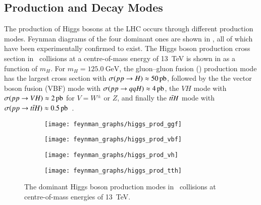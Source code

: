 \subsection{Production and Decay Modes}

The production of Higgs bosons at the LHC occurs through different production
modes. Feynman diagrams of the four dominant ones are shown in
, all of which have been experimentally confirmed to
exist. The Higgs boson production cross section in \pp~collisions at a
centre-of-mass energy of \SI{13}{\TeV} is shown in  as
a function of $m_{H}$. For $m_{H} = \SI{125.0}{\GeV}$, the gluon--gluon fusion
(\ggF) production mode has the largest cross section with
$\sigma(\pp \to H) \approx \SI{50}{\pico\barn}$, followed by the the vector
boson fusion (VBF) mode with $\sigma(\pp \to qqH) \approx \SI{4}{\pico\barn}$,
the $VH$ mode with $\sigma(\pp \to VH) \approx \SI{2}{\pico\barn}$ for
$V = W^\pm$ or $Z$, and finally the $t\bar{t} H$ mode with
$\sigma(\pp \to \ttbar H) \approx
\SI{0.5}{\pico\barn}$~\cite{deFlorian:2016spz}.

\begin{figure}[htbp]
  \centering

  \begin{subfigure}{0.48\textwidth}
    \centering
    \texttt{[image: feynman\_graphs/higgs\_prod\_ggf]}
  \end{subfigure}%
  \begin{subfigure}{0.48\textwidth}
    \centering
    \texttt{[image: feynman\_graphs/higgs\_prod\_vbf]}
  \end{subfigure}

  \vspace*{0.5em}

  \begin{subfigure}{0.48\textwidth}
    \centering
    \texttt{[image: feynman\_graphs/higgs\_prod\_vh]}
  \end{subfigure}%
  \begin{subfigure}{0.48\textwidth}
    \centering
    \texttt{[image: feynman\_graphs/higgs\_prod\_tth]}
  \end{subfigure}%

  \caption[Higgs boson production modes in \pp~collisions.]{The dominant Higgs
    boson production modes in \pp~collisions at centre-of-mass energies of
    \SI{13}{\TeV}.}%
  \label{fig:higgs_prod_feyn}
\end{figure}

